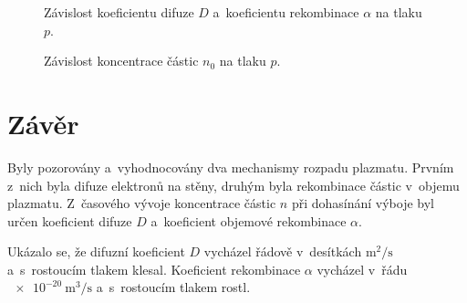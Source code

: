 \documentclass{protokol}
\newcommand\dens{n}
\newcommand\densinit{n_0}
\newcommand\pres{p}
\newcommand\diffuse{D}
\newcommand\diffuseunit{\metre\squared\per\second}
\newcommand\recomb{\alpha}
\newcommand\recombunit{\metre\cubed\per\second}
\begin{document}
\begin{figure}[htp]
	\centering
	
	
	\caption{Závislost koeficientu difuze $\diffuse$
		a~koeficientu rekombinace $\recomb$ na tlaku $\pres$.}
	\label{fig:diffuse-recomb-pres}
\end{figure}

\begin{figure}[htp]
	\centering
	
	\caption{Závislost koncentrace částic $\densinit$ na tlaku $\pres$.}
	\label{fig:density-pres}
\end{figure}

\section{Závěr}
Byly pozorovány a~vyhodnocovány dva mechanismy rozpadu plazmatu.
Prvním z~nich byla difuze elektronů na stěny,
druhým byla rekombinace částic v~objemu plazmatu.
Z~časového vývoje koncentrace částic $\dens$ při dohasínání výboje
byl určen koeficient difuze $\diffuse$
a~koeficient objemové rekombinace $\recomb$.

Ukázalo se, že difuzní koeficient $\diffuse$ vycházel řádově
v~desítkách $\si{\diffuseunit}$ a~s~rostoucím tlakem klesal.
Koeficient rekombinace $\recomb$ vycházel v~řádu $\SI{e-20}{\recombunit}$
a~s~rostoucím tlakem rostl.
\end{document}
